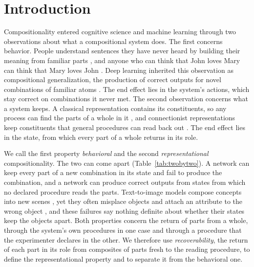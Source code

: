 \documentclass[10pt]{article}
\theoremstyle{plain}
\theoremstyle{remark}
\begin{document}
\begin{abstract}
representational from behavioral compositionality, and a probe of a pooled state and a benchmark of behavior answer different questions.
\end{abstract}

\section{Introduction}
\label{sec:intro}

Compositionality entered cognitive science and machine learning through two observations about what a compositional system does. The first concerns behavior. People understand sentences they have never heard by building their meaning from familiar parts \citep{frege1923}, and anyone who can think that John loves Mary can think that Mary loves John \citep{fodor1988}. Deep learning inherited this observation as compositional generalization, the production of correct outputs for novel combinations of familiar atoms \citep{lake2018,keysers2020,kim2020cogs,hupkes2020}. The end effect lies in the system's actions, which stay correct on combinations it never met. The second observation concerns what a system keeps. A classical representation contains its constituents, so any process can find the parts of a whole in it \citep{fodor1988}, and connectionist representations keep constituents that general procedures can read back out \citep{smolensky1990,vangelder1990}. The end effect lies in the state, from which every part of a whole returns in its role.

We call the first property \emph{behavioral} and the second \emph{representational} compositionality. The two can come apart (Table~\ref{tab:twobytwo}). A network can keep every part of a new combination in its state and fail to produce the combination, and a network can produce correct outputs from states from which no declared procedure reads the parts. Text-to-image models compose concepts into new scenes \citep{ramesh2021,okawa2023}, yet they often misplace objects \citep{conwell2022} and attach an attribute to the wrong object \citep{rassin2022}, and these failures say nothing definite about whether their states keep the objects apart. Both properties concern the return of parts from a whole, through the system's own procedures in one case and through a procedure that the experimenter declares in the other. We therefore use \emph{recoverability}, the return of each part in its role from composites of parts fresh to the reading procedure, to define the representational property and to separate it from the behavioral one.
\end{document}
